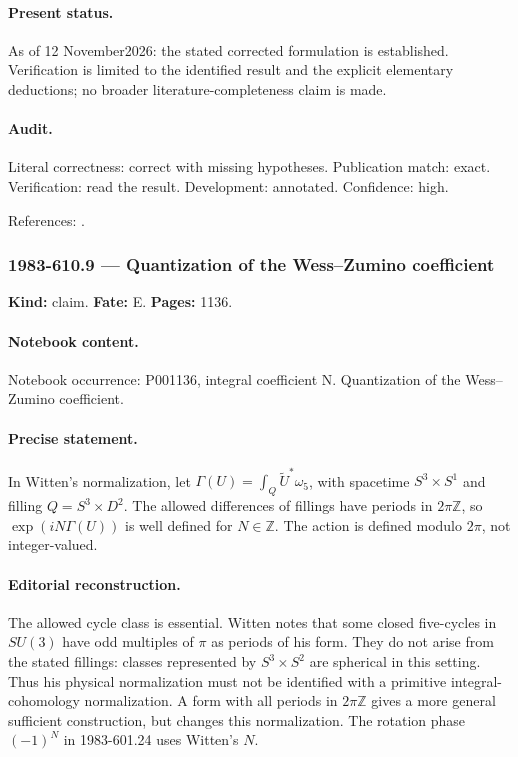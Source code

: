 \paragraph{Present status.} As of 12 November2026: the stated corrected formulation is established. Verification is limited to the identified result and the explicit elementary deductions; no broader literature-completeness claim is made.

\paragraph{Audit.} Literal correctness: correct with missing hypotheses. Publication match: exact. Verification: read the result. Development: annotated. Confidence: high.

\noindent References: \citep{witten1983current,witten1983global}.\par

\subsubsection{1983-610.9 --- Quantization of the Wess--Zumino coefficient}

\label{item:1983-610.9}

\noindent\textbf{Kind:} claim. \textbf{Fate:} E. \textbf{Pages:} 1136.\par

\paragraph{Notebook content.} Notebook occurrence: P001136, integral coefficient N. Quantization of the Wess--Zumino coefficient.

\paragraph{Precise statement.} In Witten's normalization, let \(\Gamma(U)=\int_Q\widetilde U^*\omega_5\), with spacetime \(S^3\times S^1\) and filling \(Q=S^3\times D^2\). The allowed differences of fillings have periods in \(2\pi\mathbb Z\), so \(\exp(iN\Gamma(U))\) is well defined for \(N\in\mathbb Z\). The action is defined modulo \(2\pi\), not integer-valued.

\paragraph{Editorial reconstruction.} The allowed cycle class is essential. Witten notes that some closed five-cycles in \(SU(3)\) have odd multiples of \(\pi\) as periods of his form. They do not arise from the stated fillings: classes represented by \(S^3\times S^2\) are spherical in this setting. Thus his physical normalization must not be identified with a primitive integral-cohomology normalization. A form with all periods in \(2\pi\mathbb Z\) gives a more general sufficient construction, but changes this normalization. The rotation phase \((-1)^N\) in 1983-601.24 uses Witten's \(N\).

